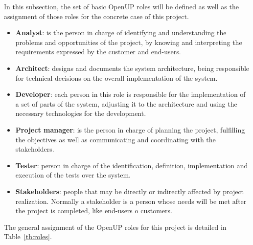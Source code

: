 In this subsection, the set of basic OpenUP roles will be defined as well as the assignment of those roles for the concrete case of this project.

\begin{itemize}
\item \textbf{Analyst}: is the person in charge of identifying and understanding the problems and opportunities of the project, by knowing and interpreting the requirements expressed by the customer and end-users.

\item \textbf{Architect}: designs and documents the system architecture, being responsible for technical decisions on the overall implementation of the system.

\item \textbf{Developer}: each person in this role is responsible for the implementation of a set of parts of the system, adjusting it to the architecture and using the necessary technologies for the development.

\item \textbf{Project manager}: is the person in charge of planning the project, fulfilling the objectives as well as communicating and coordinating with the stakeholders.

\item \textbf{Tester}: person in charge of the identification, definition, implementation and execution of the tests over the system.

\item \textbf{Stakeholders}: people that may be directly or indirectly affected by project realization. Normally a stakeholder is a person whose needs will be met after the project is completed, like end-users o customers.
\end{itemize}

The general assignment of the OpenUP roles for this project is detailed in Table~\ref{tb:roles}.

